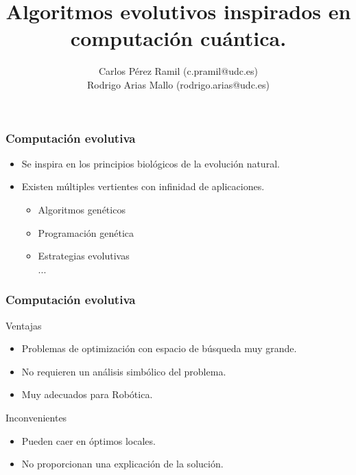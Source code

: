 \documentclass{beamer}
\title{Algoritmos evolutivos inspirados en computación cuántica.}
\author{Carlos Pérez Ramil (c.pramil@udc.es)\\
	Rodrigo Arias Mallo (rodrigo.arias@udc.es)}
\begin{document}




\frame{\titlepage}

\begin{frame}
\frametitle{Computación evolutiva}

\begin{itemize}
\item Se inspira en los principios biológicos de la evolución natural.
\item Existen múltiples vertientes con infinidad de aplicaciones.
\begin{itemize}
	\item Algoritmos genéticos
	\item Programación genética
	\item Estrategias evolutivas
\\...
\end{itemize}
\end{itemize}

\end{frame}
\begin{frame}
\frametitle{Computación evolutiva}

\begin{block}{Ventajas}
\begin{itemize}
\item Problemas de optimización con espacio de búsqueda muy grande.
\item No requieren un análisis simbólico del problema.
\item Muy adecuados para Robótica.
\end{itemize}
\end{block}

\begin{block}{Inconvenientes}
\begin{itemize}
\item Pueden caer en óptimos locales.
\item No proporcionan una explicación de la solución.
\end{itemize}
\end{block}

\end{frame}
\end{document}
